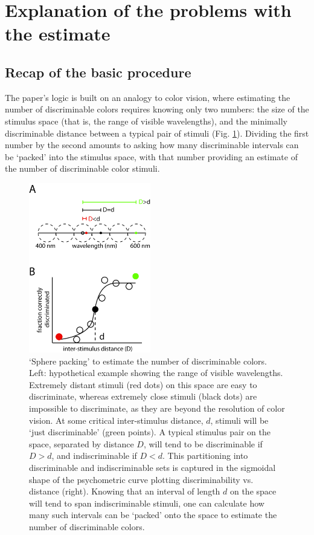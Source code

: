 \documentclass[letterpaper,twocolumn,10pt]{article}
\begin{document}
\section{Explanation of the problems with the estimate}
\label{sec:explanation}

\subsection{Recap of the basic procedure}
\label{sec:recap}

The paper's logic is built on an analogy to color vision, 
where estimating the number of discriminable colors requires knowing only two numbers: 
the size of the stimulus space (that is, the range of visible wavelengths), 
and the minimally discriminable distance between a typical pair of stimuli (Fig. \ref{fig:spherepacking}). 
Dividing the first number by the second amounts to asking how many discriminable intervals can be ‘packed’ into the stimulus space, 
with that number providing an estimate of the number of discriminable color stimuli. 

\begin{figure}
    \centering
    \includegraphics[width=0.475\textwidth]{figures/Fig4_SpherePacking}
    \caption{
`Sphere packing' to estimate the number of discriminable colors. 
Left: hypothetical example showing the range of visible wavelengths. 
Extremely distant stimuli (red dots) on this space are easy to discriminate, 
whereas extremely close stimuli (black dots) are impossible to discriminate, 
as they are beyond the resolution of color vision. 
At some critical inter-stimulus distance, $d$, 
stimuli will be `just discriminable' (green points). 
A typical stimulus pair on the space, separated by distance $D$, 
will tend to be discriminable if $D>d$, and indiscriminable if $D<d$. 
This partitioning into discriminable and indiscriminable sets is captured in the sigmoidal shape 
of the psychometric curve plotting discriminability vs. distance (right). 
Knowing that an interval of length $d$ on the space will tend to span indiscriminable stimuli, 
one can calculate how many such intervals can be `packed' onto the space
to estimate the number of discriminable colors.}
    \label{fig:spherepacking}
\end{figure}
\end{document}
